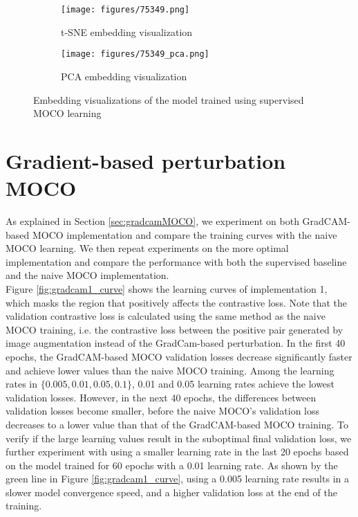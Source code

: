 \documentclass[12pt,twoside]{report}
\begin{document}
\begin{figure}
\centering
    \begin{subfigure}{.45\textwidth}
      \centering
      \texttt{[image: figures/75349.png]}
      \caption{t-SNE embedding visualization}
      \label{fig:supervisedMOCO_tsne}
    \end{subfigure}%
    \begin{subfigure}{.45\textwidth}
      \centering
      \texttt{[image: figures/75349\_pca.png]}
      \caption{PCA embedding visualization}
      \label{fig:supervisedMOCO_pca}
    \end{subfigure}
    \caption{Embedding visualizations of the model trained using supervised MOCO learning}
    \label{fig:supervisedMOCO_embedding}
\end{figure}

\section{Gradient-based perturbation MOCO} \label{sec:gradientMOCO_eval}
As explained in Section \ref{sec:gradcamMOCO}, we experiment on both GradCAM-based MOCO implementation and compare the training curves with the naive MOCO learning. We then repeat experiments on the more optimal implementation and compare the performance with both the supervised baseline and the naive MOCO implementation.\\ 

Figure \ref{fig:gradcam1_curve} shows the learning curves of implementation 1, which masks the region that positively affects the contrastive loss. Note that the validation contrastive loss is calculated using the same method as the naive MOCO training, i.e. the contrastive loss between the positive pair generated by image augmentation instead of the GradCam-based perturbation. In the first 40 epochs, the GradCAM-based MOCO validation losses decrease significantly faster and achieve lower values than the naive MOCO training. Among the learning rates in $\{0.005, 0.01, 0.05, 0.1\}$, 0.01 and 0.05 learning rates achieve the lowest validation losses. However, in the next 40 epochs, the differences between validation losses become smaller, before the naive MOCO's validation loss decreases to a lower value than that of the GradCAM-based MOCO training. To verify if the large learning values result in the suboptimal final validation loss, we further experiment with using a smaller learning rate in the last 20 epochs based on the model trained for 60 epochs with a 0.01 learning rate. As shown by the green line in Figure \ref{fig:gradcam1_curve}, using a 0.005 learning rate results in a slower model convergence speed, and a higher validation loss at the end of the training. \\
\end{document}
